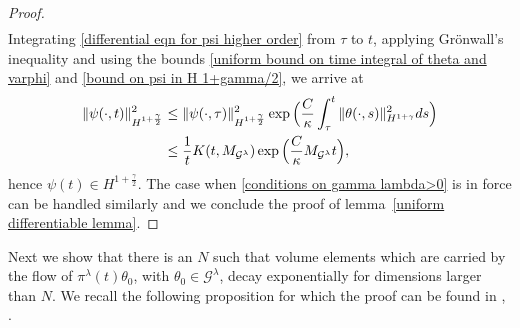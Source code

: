 \documentclass[reqno]{amsart}%
\theoremstyle{definition}
\theoremstyle{remark}
\numberwithin{equation}{section}
\newcommand{\1}{\mathbf{1}}
\newcommand{\Gg}{\mathcal{G}^{\lambda}}
\newcommand{\pin}{\pi^{\lambda}}
\numberwithin{equation}{section}
\numberwithin{theorem}{section}
\numberwithin{figure}{section}
\begin{document}
\begin{proof}
\begin{align}
\end{align}
Integrating \eqref{differential eqn for psi higher order} from $\tau$ to $t$, applying Gr\"{o}nwall's inequality and using the bounds \eqref{uniform bound on time integral of theta and varphi} and \eqref{bound on psi in H 1+gamma/2}, we arrive at
\begin{align}\label{H 1+gamma/2 bound on psi}
\|\psi(\cdot,t)\|^2_{H^{1+\frac{\gamma}{2}}}&\le \|\psi(\cdot,\tau)\|^2_{H^{1+\frac{\gamma}{2}}}\exp\Big(\frac{C}{\kappa}\int_{\tau}^t\|\theta(\cdot,s)\|^2_{H^{1+\gamma}}ds\Big)\notag\\
&\le \frac{1}{t}K(t,M_{\Gg})\exp\Big(\frac{C}{\kappa}M_{\Gg}t\Big),
\end{align}
hence $\psi(t)\in H^{1+\frac{\gamma}{2}}$. The case when \eqref{conditions on gamma lambda>0} is in force can be handled similarly and we conclude the proof of lemma~\ref{uniform differentiable lemma}.
\end{proof}

Next we show that there is an $N$ such that volume elements which are carried by the flow of $\pin(t)\theta_0$, with $\theta_0\in\Gg$, decay exponentially for dimensions larger than $N$. We recall the following proposition for which the proof can be found in \cite{CF85}, \cite{CF88}.
\end{document}
